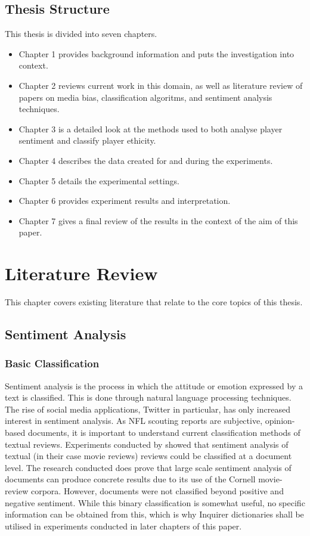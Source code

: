\documentclass[oneside,12pt]{Classes/RoboticsLaTeX}
\begin{document}
\section{Thesis Structure}
This thesis is divided into seven chapters.
\begin{itemize}
  \item Chapter 1 provides background information and puts the investigation into context.
  \item Chapter 2 reviews current work in this domain, as well as literature review of papers on media bias, classification algoritms, and sentiment analysis techniques.
  \item Chapter 3 is a detailed look at the methods used to both analyse player sentiment and classify player ethicity.
  \item Chapter 4 describes the data created for and during the experiments.
  \item Chapter 5 details the experimental settings.
  \item Chapter 6 provides experiment results and interpretation.
  \item Chapter 7 gives a final review of the results in the context of the aim of this paper.
\end{itemize}


\chapter{Literature Review}
\label{chap:lit_review}
This chapter covers existing literature that relate to the core topics of this thesis.
\section{Sentiment Analysis}
\subsection{Basic Classification}
Sentiment analysis is the process in which the attitude or emotion expressed by a text is classified. This is done through natural language processing techniques. The rise of social media applications, Twitter in particular, 
has only increased interest in sentiment analysis. As NFL scouting reports are subjective, opinion-based documents, it is important to understand current classification methods of textual reviews. Experiments conducted by 
\citet{SentiAnalysis} showed that sentiment analysis of textual (in their case movie reviews) reviews could be classified at a document level. The research conducted does prove that large scale sentiment analysis of documents can
produce concrete results due to its use of the Cornell movie-review corpora. However, documents were not classified beyond positive and negative sentiment. While this binary classification is somewhat useful,
no specific information can be obtained from this, which is why Inquirer dictionaries shall be utilised in experiments conducted in later chapters of this paper.
\end{document}
